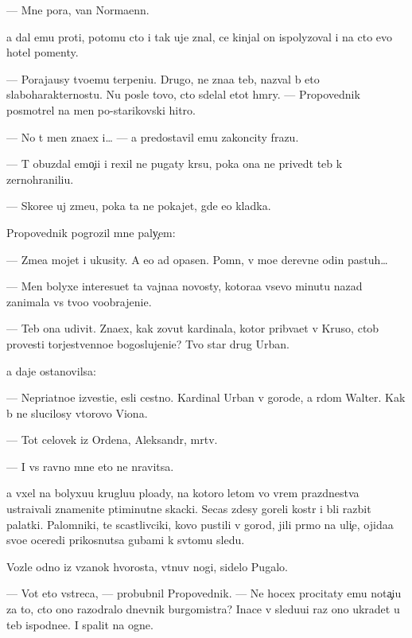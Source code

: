 \documentclass[10pt]{book}
\begin{document}
— Mne pora, van Normaenn.

{\Y}a dal {\y}emu pro{\y}ti, potomu cto i tak uje znal, ce{\y} kinjal on ispolyzoval i na cto {\y}evo hotel pomen{\ia}ty.



— Poraja{\y}usy tvo{\y}emu terpeni{\y}u. Drugo{\y}, ne zna{\y}a teb{\ia}, nazval b{\yi} eto slaboharakternost{\y}u. Nu posle tovo, cto sdelal etot hm{\yi}ry. — Propovednik posmotrel na men{\ia} po-starikovski hitro.

— No t{\yi} men{\ia} zna{\y}ex i… — {\Y}a predostavil {\y}emu zakoncity frazu.

— T{\yi} obuzdal emo{\c}i{\y}i i rexil ne pugaty kr{\yi}su, poka ona ne prived{\e}t teb{\ia} k zernohranili{\x}u.

— Skore{\y}e uj zme{\y}u, poka ta ne pokajet, gde {\y}e{\y}o kladka.

Propovednik pogrozil mne paly{\c}em:

— Zme{\y}a mojet i ukusity. A {\y}e{\y}o {\y}ad opasen. Pomn{\iu}, v mo{\y}e{\y} derevne odin pastuh…

— Men{\ia} bolyxe interesu{\y}et ta vajna{\y}a novosty, kotora{\y}a vsevo minutu nazad zanimala vs{\e} tvo{\y}o voobrajeni{\y}e.

— Teb{\ia} ona udivit. Zna{\y}ex, kak zovut kardinala, kotor{\yi}{\y} prib{\yi}va{\y}et v Kruso, ctob{\yi} provesti torjestvenno{\y}e bogoslujeni{\y}e? Tvo{\y} star{\yi}{\y} drug Urban.

{\Y}a daje ostanovilsa:

— Nepri{\y}atno{\y}e izvesti{\y}e, {\y}esli cestno. Kardinal Urban v gorode, a r{\ia}dom Walter. Kak b{\yi} ne slucilosy vtorovo Viona.

— Tot celovek iz Ordena, Aleksandr, m{\e}rtv.

— I vs{\e} ravno mne eto ne nravitsa.

{\Y}a v{\yi}xel na bolyxu{\y}u kruglu{\y}u plo{\x}ady, na kotoro{\y} letom vo vrem{\ia} prazdnestva ustra{\y}ivali znamenit{\yi}{\y}e p{\ia}timinutn{\yi}{\y}e skacki. Se{\y}cas zdesy goreli kostr{\yi} i b{\yi}li razbit{\yi} palatki. Palomniki, te scastlivciki, kovo pustili v gorod, jili pr{\ia}mo na uli{\c}e, ojida{\y}a svo{\y}e{\y} oceredi prikosnutsa gubami k sv{\ia}tomu sledu.

Vozle odno{\y} iz v{\ia}zanok hvorosta, v{\yi}t{\ia}nuv nogi, sidelo Pugalo.

— Vot eto vstreca, — probubnil Propovednik. — Ne hocex procitaty {\y}emu nota{\c}i{\y}u za to, cto ono razodralo dnevnik burgomistra? Inace v sledu{\y}u{\x}i{\y} raz ono ukradet u teb{\ia} ispodne{\y}e. I spalit na ogne.
\end{document}
